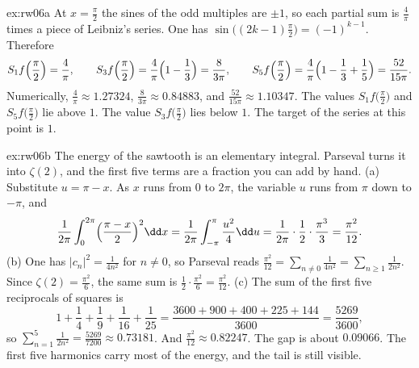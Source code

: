 \begin{solution}{ex:rw06a}
\idea At $x=\frac\pi2$ the sines of the odd multiples are $\pm1$, so each partial sum is $\frac4\pi$ times a piece of Leibniz's series.
\writeup One has $\sin\bigl((2k-1)\frac\pi2\bigr)=(-1)^{k-1}$. Therefore
\[
S_1f\Bigl(\frac\pi2\Bigr)=\frac4\pi,\qquad
S_3f\Bigl(\frac\pi2\Bigr)=\frac4\pi\Bigl(1-\frac13\Bigr)=\frac8{3\pi},\qquad
S_5f\Bigl(\frac\pi2\Bigr)=\frac4\pi\Bigl(1-\frac13+\frac15\Bigr)=\frac{52}{15\pi}.
\]
Numerically, $\frac4\pi\approx1.27324$, $\frac8{3\pi}\approx0.84883$, and $\frac{52}{15\pi}\approx1.10347$. The values $S_1f\bigl(\frac\pi2\bigr)$ and $S_5f\bigl(\frac\pi2\bigr)$ lie above $1$. The value $S_3f\bigl(\frac\pi2\bigr)$ lies below $1$. The target of the series at this point is $1$.
\end{solution}

\begin{solution}{ex:rw06b}
\idea The energy of the sawtooth is an elementary integral. Parseval turns it into $\zeta(2)$, and the first five terms are a fraction you can add by hand.
\writeup (a) Substitute $u=\pi-x$. As $x$ runs from $0$ to $2\pi$, the variable $u$ runs from $\pi$ down to $-\pi$, and
\[
\frac1{2\pi}\int_0^{2\pi}\Bigl(\frac{\pi-x}2\Bigr)^2\dd x=\frac1{2\pi}\int_{-\pi}^\pi\frac{u^2}4\dd u=\frac1{2\pi}\cdot\frac12\cdot\frac{\pi^3}3=\frac{\pi^2}{12}.
\]
(b) One has $|c_n|^2=\frac1{4n^2}$ for $n\ne0$, so Parseval reads $\frac{\pi^2}{12}=\sum_{n\ne0}\frac1{4n^2}=\sum_{n\ge1}\frac1{2n^2}$. Since $\zeta(2)=\frac{\pi^2}6$, the same sum is $\frac12\cdot\frac{\pi^2}6=\frac{\pi^2}{12}$.
(c) The sum of the first five reciprocals of squares is
\[
1+\frac14+\frac19+\frac1{16}+\frac1{25}=\frac{3600+900+400+225+144}{3600}=\frac{5269}{3600},
\]
so $\sum_{n=1}^5\frac1{2n^2}=\frac{5269}{7200}\approx0.73181$. And $\frac{\pi^2}{12}\approx0.82247$. The gap is about $0.09066$. The first five harmonics carry most of the energy, and the tail is still visible.
\end{solution}

